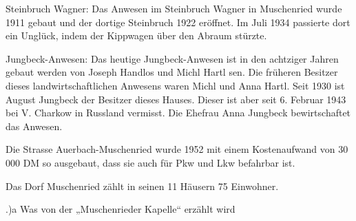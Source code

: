 \documentclass{book}
\begin{document}
Steinbruch Wagner: Das Anwesen im Steinbruch Wagner in Muschenried wurde 1911
gebaut und der dortige Steinbruch 1922 eröffnet. Im Juli 1934 passierte dort ein
Unglück, indem der Kippwagen über den Abraum stürzte.

Jungbeck-Anwesen: Das heutige Jungbeck-Anwesen ist in den achtziger Jahren
gebaut werden von Joseph Handlos und Michl Hartl sen. Die früheren Besitzer
dieses landwirtschaftlichen Anwesens waren Michl und Anna Hartl. Seit 1930 ist
August Jungbeck der Besitzer dieses Hauses. Dieser ist aber seit 6. Februar 1943
bei V. Charkow in Russland vermisst. Die Ehefrau Anna Jungbeck bewirtschaftet
das Anwesen.

Die Strasse Auerbach-Muschenried wurde 1952 mit einem Kostenaufwand von 30 000
DM so ausgebaut, dass sie auch für Pkw und Lkw befahrbar ist.

Das Dorf Muschenried zählt in seinen 11 Häusern 75 Einwohner.

.)a Was von der „Muschenrieder Kapelle“ erzählt wird
\end{document}
